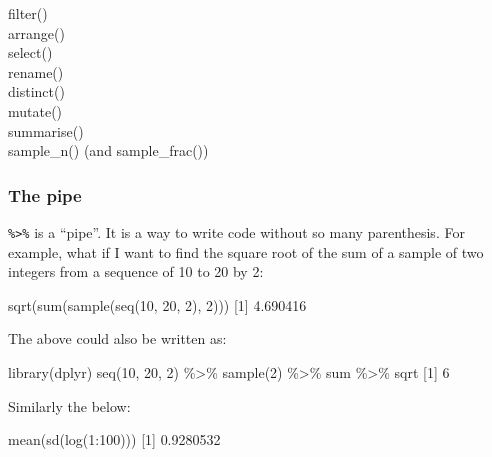 \documentclass[
]{book}
\newenvironment{Shaded}{\begin{snugshade}}{\end{snugshade}}
\newcommand{\DecValTok}[1]{\textcolor[rgb]{0.00,0.00,0.81}{#1}}
\newcommand{\FloatTok}[1]{\textcolor[rgb]{0.00,0.00,0.81}{#1}}
\newcommand{\FunctionTok}[1]{\textcolor[rgb]{0.00,0.00,0.00}{#1}}
\newcommand{\NormalTok}[1]{#1}
\newcommand{\SpecialCharTok}[1]{\textcolor[rgb]{0.00,0.00,0.00}{#1}}
\begin{document}
filter()\\
arrange()\\
select()\\
rename()\\
distinct()\\
mutate()\\
summarise()\\
sample\_n() (and sample\_frac())

\hypertarget{the-pipe}{%
\subsubsection{The pipe}\label{the-pipe}}

\texttt{\%\textgreater{}\%} is a ``pipe''. It is a way to write code without so many parenthesis. For example, what if I want to find the square root of the sum of a sample of two integers from a sequence of 10 to 20 by 2:

\begin{Shaded}
\begin{Highlighting}[]
\FunctionTok{sqrt}\NormalTok{(}\FunctionTok{sum}\NormalTok{(}\FunctionTok{sample}\NormalTok{(}\FunctionTok{seq}\NormalTok{(}\DecValTok{10}\NormalTok{, }\DecValTok{20}\NormalTok{, }\DecValTok{2}\NormalTok{), }\DecValTok{2}\NormalTok{)))}
\NormalTok{[}\DecValTok{1}\NormalTok{] }\FloatTok{4.690416}
\end{Highlighting}
\end{Shaded}

The above could also be written as:

\begin{Shaded}
\begin{Highlighting}[]
\FunctionTok{library}\NormalTok{(dplyr)}
\FunctionTok{seq}\NormalTok{(}\DecValTok{10}\NormalTok{, }\DecValTok{20}\NormalTok{, }\DecValTok{2}\NormalTok{) }\SpecialCharTok{\%\textgreater{}\%} \FunctionTok{sample}\NormalTok{(}\DecValTok{2}\NormalTok{) }\SpecialCharTok{\%\textgreater{}\%}\NormalTok{ sum }\SpecialCharTok{\%\textgreater{}\%}\NormalTok{ sqrt}
\NormalTok{[}\DecValTok{1}\NormalTok{] }\DecValTok{6}
\end{Highlighting}
\end{Shaded}

Similarly the below:

\begin{Shaded}
\begin{Highlighting}[]
\FunctionTok{mean}\NormalTok{(}\FunctionTok{sd}\NormalTok{(}\FunctionTok{log}\NormalTok{(}\DecValTok{1}\SpecialCharTok{:}\DecValTok{100}\NormalTok{)))}
\NormalTok{[}\DecValTok{1}\NormalTok{] }\FloatTok{0.9280532}
\end{Highlighting}
\end{Shaded}
\end{document}
